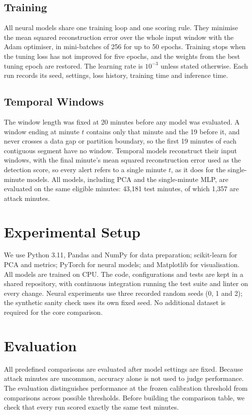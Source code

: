 \documentclass[conference]{IEEEtran}
\begin{document}
\subsection{Training}
All neural models share one training loop and one scoring rule. They minimise the mean squared reconstruction error over the whole input window with the Adam optimiser, in mini-batches of 256 for up to 50 epochs. Training stops when the tuning loss has not improved for five epochs, and the weights from the best tuning epoch are restored. The learning rate is $10^{-3}$ unless stated otherwise. Each run records its seed, settings, loss history, training time and inference time.

\subsection{Temporal Windows}
The window length was fixed at 20 minutes before any model was evaluated. A window ending at minute $t$ contains only that minute and the 19 before it, and never crosses a data gap or partition boundary, so the first 19 minutes of each contiguous segment have no window. Temporal models reconstruct their input windows, with the final minute's mean squared reconstruction error used as the detection score, so every alert refers to a single minute $t$, as it does for the single-minute models. All models, including PCA and the single-minute MLP, are evaluated on the same eligible minutes: 43,181 test minutes, of which 1,357 are attack minutes.

\section{Experimental Setup}
We use Python 3.11, Pandas and NumPy for data preparation; scikit-learn for PCA and metrics; PyTorch for neural models; and Matplotlib for visualisation. All models are trained on CPU. The code, configurations and tests are kept in a shared repository, with continuous integration running the test suite and linter on every change. Neural experiments use three recorded random seeds (0, 1 and 2); the synthetic sanity check uses its own fixed seed. No additional dataset is required for the core comparison.

\section{Evaluation}
All predefined comparisons are evaluated after model settings are fixed. Because attack minutes are uncommon, accuracy alone is not used to judge performance. The evaluation distinguishes performance at the frozen calibration threshold from comparisons across possible thresholds. Before building the comparison table, we check that every run scored exactly the same test minutes.
\end{document}

